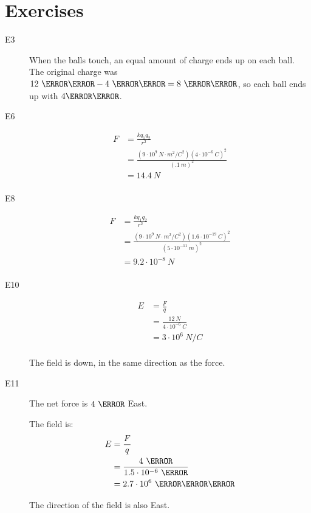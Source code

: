\documentclass{exam}
\begin{document}
\section{Exercises}

\begin{description}
\item[E3]
When the balls touch, an equal amount of charge ends up on each ball.  The original charge was 
$12 \ \micro\coulomb - 4 \ \micro\coulomb = 8 \ \micro\coulomb$, so each ball ends up with $4 \micro\coulomb$.

\item[E6]
\begin{align*}
   F &= \frac{kq_1q_2}{r^2} \\
     &= \frac{(9 \cdot 10^9 \ N \cdot m^2/C^2)(4 \cdot 10^{-6} \ C)^2}{(.1 \ m)^2} \\
     &= 14.4 \ N \\
\end{align*}

\item[E8]
\begin{align*}
   F &= \frac{kq_1q_2}{r^2} \\
     &= \frac{(9 \cdot 10^9 \ N \cdot m^2/C^2)(1.6 \cdot 10^{-19} \ C)^2}{(5 \cdot 10^{-11} \ m)^2} \\
     &= 9.2 \cdot 10^{-8} \ N \\
\end{align*}

\item[E10]
\begin{align*}
  E &= \frac{F}{q} \\
    &= \frac{12 \ N}{4 \cdot 10^{-6} \ C} \\
    &= 3 \cdot 10^{6} \ N/C \\
\end{align*}

The field is down, in the same direction as the force.

\item[E11]
The net force is $4 \ \newton$ East.

The field is:
\begin{align*}
  E &= \frac{F}{q} \\
    &= \frac{4 \ \newton}{1.5 \cdot 10^{-6} \ \coulomb} \\
    &= 2.7 \cdot 10^{6} \ \newton \per \coulomb \\
\end{align*}

The direction of the field is also East.


\end{description}
\end{document}
